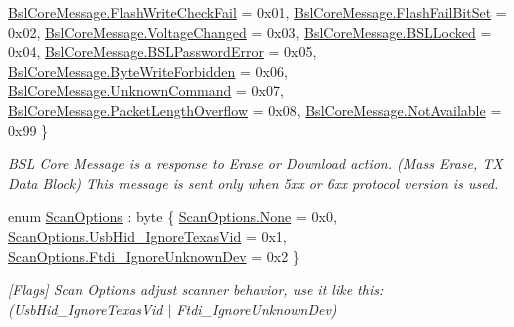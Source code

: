 \begin{DoxyCompactItemize}
\mbox{\hyperlink{namespace_b_s_l430___n_e_t_ac916153c12b33a95ee1fd35e1a15f17aa5354401133c7c40d5aa414b29fcd77a8}{Bsl\+Core\+Message.\+Flash\+Write\+Check\+Fail}} = 0x01, 
\mbox{\hyperlink{namespace_b_s_l430___n_e_t_ac916153c12b33a95ee1fd35e1a15f17aa9c513065679db4b2f6c5943eb5802a49}{Bsl\+Core\+Message.\+Flash\+Fail\+Bit\+Set}} = 0x02, 
\mbox{\hyperlink{namespace_b_s_l430___n_e_t_ac916153c12b33a95ee1fd35e1a15f17aa4491275bddbd804048d2d4599da326b0}{Bsl\+Core\+Message.\+Voltage\+Changed}} = 0x03, 
\newline
\mbox{\hyperlink{namespace_b_s_l430___n_e_t_ac916153c12b33a95ee1fd35e1a15f17aaad25c5ec3eb9475e0a27d027d54e59e8}{Bsl\+Core\+Message.\+B\+S\+L\+Locked}} = 0x04, 
\mbox{\hyperlink{namespace_b_s_l430___n_e_t_ac916153c12b33a95ee1fd35e1a15f17aac9234dfa56b502931ee349d25e1436bb}{Bsl\+Core\+Message.\+B\+S\+L\+Password\+Error}} = 0x05, 
\mbox{\hyperlink{namespace_b_s_l430___n_e_t_ac916153c12b33a95ee1fd35e1a15f17aa8711d08dcdabe7ed1b1d60329afef3c1}{Bsl\+Core\+Message.\+Byte\+Write\+Forbidden}} = 0x06, 
\mbox{\hyperlink{namespace_b_s_l430___n_e_t_ac916153c12b33a95ee1fd35e1a15f17aae186ae062361df4aeb3f0c5420542d8e}{Bsl\+Core\+Message.\+Unknown\+Command}} = 0x07, 
\newline
\mbox{\hyperlink{namespace_b_s_l430___n_e_t_ac916153c12b33a95ee1fd35e1a15f17aa2a57b7e43d1cdfbae7ef4a5fc5e7aa04}{Bsl\+Core\+Message.\+Packet\+Length\+Overflow}} = 0x08, 
\mbox{\hyperlink{namespace_b_s_l430___n_e_t_ac916153c12b33a95ee1fd35e1a15f17aa534ceac854da4ba59c4dc41b7ab732dc}{Bsl\+Core\+Message.\+Not\+Available}} = 0x99
 \}
\begin{DoxyCompactList}\small\item\em B\+SL Core Message is a response to Erase or Download action. (Mass Erase, TX Data Block) This message is sent only when 5xx or 6xx protocol version is used. \end{DoxyCompactList}\item 
enum \mbox{\hyperlink{namespace_b_s_l430___n_e_t_a4cd6f8166a2a97ccb3405df2287d4ba8}{Scan\+Options}} \+: byte \{ \mbox{\hyperlink{namespace_b_s_l430___n_e_t_a4cd6f8166a2a97ccb3405df2287d4ba8a6adf97f83acf6453d4a6a4b1070f3754}{Scan\+Options.\+None}} = 0x0, 
\mbox{\hyperlink{namespace_b_s_l430___n_e_t_a4cd6f8166a2a97ccb3405df2287d4ba8a312c91a2fcbbf5ab7fc303f318179b60}{Scan\+Options.\+Usb\+Hid\+\_\+\+Ignore\+Texas\+Vid}} = 0x1, 
\mbox{\hyperlink{namespace_b_s_l430___n_e_t_a4cd6f8166a2a97ccb3405df2287d4ba8afbe2059f92ca0f1d2a8fe47b5853f0e1}{Scan\+Options.\+Ftdi\+\_\+\+Ignore\+Unknown\+Dev}} = 0x2
 \}
\begin{DoxyCompactList}\small\item\em \mbox{[}Flags\mbox{]} Scan Options adjust scanner behavior, use it like this\+: (Usb\+Hid\+\_\+\+Ignore\+Texas\+Vid $\vert$ Ftdi\+\_\+\+Ignore\+Unknown\+Dev) 


\end{DoxyCompactList}
\end{DoxyCompactItemize}
